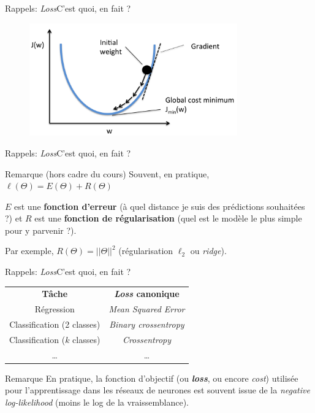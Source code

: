 \documentclass[12pt,dvipsnames,aspectratio=169]{beamer}
\begin{document}
\begin{frame}{Rappels: \textit{Loss}}{C'est quoi, en fait ?}
\begin{figure}
    \centering
    \includegraphics[width=0.8\textwidth]{gradient_descent_1parameter.png}
\end{figure}
\end{frame}

\begin{frame}{Rappels: \textit{Loss}}{C'est quoi, en fait ?}

    \begin{block}{Remarque (hors cadre du cours)}
        Souvent, en pratique, $\ell(\Theta) = E(\Theta) + R(\Theta)$

        \vspace{1em}
        
        $E$ est une \textbf{fonction d'erreur} (à quel distance je suis des prédictions souhaitées ?) et $R$ est une \textbf{fonction de régularisation} (quel est le modèle le plus simple pour y parvenir ?).\par
        Par exemple, $R(\Theta) = ||\Theta||^2$ (régularisation $\ell_2$ ou \textit{ridge}).

    \end{block}

\end{frame}

\begin{frame}{Rappels: \textit{Loss}}{C'est quoi, en fait ?}
    \begin{table}[]
        \centering
        \begin{tabular}{c|c}
             \textbf{Tâche} & \textbf{\textit{Loss} canonique} \\
             Régression & \textit{Mean Squared Error} \\
             Classification (2 classes) & \textit{Binary crossentropy} \\
             Classification ($k$ classes) & \textit{Crossentropy} \\
             \dots & \dots
        \end{tabular}
    \end{table}

    \begin{block}{Remarque}
        En pratique, la fonction d'objectif (ou \textbf{\textit{loss}}, ou encore \textit{cost}) utilisée pour l'apprentissage dans les réseaux de neurones est souvent issue de la \textit{negative log-likelihood} (moins le log de la vraissemblance).
    \end{block}

    
\end{frame}
\end{document}
